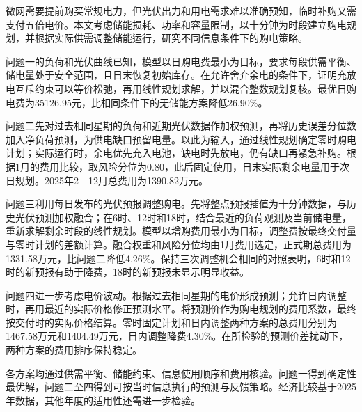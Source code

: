 微网需要提前购买常规电力，但光伏出力和用电需求难以准确预知，临时补购又需支付五倍电价。本文考虑储能损耗、功率和容量限制，以十分钟为时段建立购电规划，并根据实际供需调整储能运行，研究不同信息条件下的购电策略。

问题一的负荷和光伏曲线已知，模型以日购电费最小为目标，要求每段供需平衡、储电量处于安全范围，且日末恢复初始库存。在允许舍弃余电的条件下，证明充放电互斥约束可以等价松弛，再用线性规划求解，并以混合整数规划复核。最优日购电费为35126.95元，比相同条件下的无储能方案降低26.90\%。

问题二先对过去相同星期的负荷和近期光伏数据作加权预测，再将历史误差分位数加入净负荷预测，为供电缺口预留电量。以此为输入，通过线性规划确定零时购电计划；实际运行时，余电优先充入电池，缺电时先放电，仍有缺口再紧急补购。根据1月的费用比较，取风险分位为0.80，此后固定使用，日末实际剩余电量用于次日规划。2025年2—12月总费用为1390.82万元。

问题三利用每日发布的光伏预报调整购电。先将整点预报插值为十分钟数据，与历史光伏预测加权融合；在6时、12时和18时，结合最近的负荷观测及当前储电量，重新求解剩余时段的线性规划。模型以增购费用最小为目标，调整费按最终交付量与零时计划的差额计算。融合权重和风险分位均由1月费用选定，正式期总费用为1331.58万元，比问题二降低4.26\%。保持三次调整机会相同的对照表明，6时和12时的新预报有助于降费，18时的新预报未显示明显收益。

问题四进一步考虑电价波动。根据过去相同星期的电价形成预测；允许日内调整时，再用最近的实际价格修正预测水平。将预测价作为购电规划的费用系数，最终按交付时的实际价格结算。零时固定计划和日内调整两种方案的总费用分别为1467.58万元和1404.49万元，日内调整降费4.30\%。在所检验的预测价差扰动下，两种方案的费用排序保持稳定。

各方案均通过供需平衡、储能约束、信息使用顺序和费用核验。问题一得到确定性最优解，问题二至四得到可按当时信息执行的预测与反馈策略。经济比较基于2025年数据，其他年度的适用性还需进一步检验。
